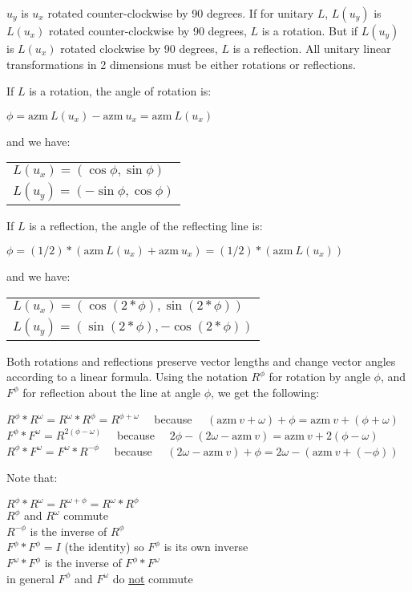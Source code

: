 \documentclass[12pt]{article}
\begin{document}
$u_y$ is $u_x$ rotated counter-clockwise by 90 degrees.
If for unitary $L$, $L(u_y)$ is $L(u_x)$ rotated counter-clockwise
by 90 degrees, $L$ is a rotation.
But if $L(u_y)$ is $L(u_x)$ rotated clockwise
by 90 degrees, $L$ is a reflection.  All unitary linear transformations
in 2 dimensions must be either rotations or reflections.

If $L$ is a rotation, the angle of rotation is: \\
\centerline{$\phi = \mathrm{azm}~L(u_x) - \mathrm{azm}~u_x =
             \mathrm{azm}~L(u_x)$}
and we have: \begin{tabular}[t]{l}
             $L(u_x)=(\cos\phi,\sin\phi)$ \\
             $L(u_y)=(-\sin\phi,\cos\phi)$ \\
	     \end{tabular}

If $L$ is a reflection, the angle of the reflecting line is: \\
\centerline{$\phi = (1/2)*(\mathrm{azm}~L(u_x) + \mathrm{azm}~u_x)
                  = (1/2)*(\mathrm{azm}~L(u_x))$}
and we have: \begin{tabular}[t]{l}
             $L(u_x)=(\cos(2*\phi),\sin(2*\phi))$ \\
             $L(u_y)=(\sin(2*\phi),-\cos(2*\phi))$ \\
	     \end{tabular}

Both rotations and reflections preserve vector lengths
and change vector angles according to a linear formula.
Using the notation $R^\phi$ for rotation by angle $\phi$,
and $F^\phi$ for reflection about the line at angle $\phi$,
we get the following:
\begin{center}
$R^\phi*R^\omega=R^\omega*R^\phi=R^{\phi+\omega}$
~~because~~
    $(\mathrm{azm}~v + \omega) + \phi = \mathrm{azm}~v + (\phi+\omega)$ \\
$F^\phi*F^\omega = R^{2(\phi-\omega)}$
~~because~~
    $2\phi - (2\omega - \mathrm{azm}~v) = \mathrm{azm}~v + 2(\phi-\omega)$ \\
$R^\phi*F^\omega = F^\omega*R^{-\phi}$
~~because~~
    $(2\omega - \mathrm{azm}~v) + \phi =
      2\omega - (\mathrm{azm}~v + (-\phi))$
\end{center}
Note that:
\begin{center}
$R^\phi*R^\omega=R^{\omega+\phi}=R^\omega*R^\phi$ \\
$R^\phi$ and $R^\omega$ commute \\
$R^{-\phi}$ is the inverse of $R^\phi$ \\
$F^\phi*F^\phi= I$ (the identity) so  $F^\phi$ is its own inverse \\
$F^\omega*F^\phi$ is the inverse of $F^\phi*F^\omega$ \\
in general $F^\phi$ and $F^\omega$ do \underline{not} commute\\
\end{center}
\end{document}
